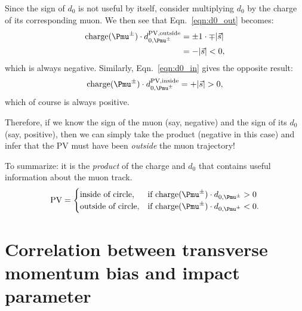 Since the sign of $d_0$ is not useful by itself, consider multiplying $d_0$ by the charge of its corresponding muon. 
We then see that Eqn.~\ref{eqn:d0_out} becomes:
\begin{align*}
    {\rm charge}(\Pmu^{\pm}) \cdot d_{0,\Pmu^{\pm}}^{\text{PV,outside}} &= \pm1 \cdot \mp \lvert \vec{s} \rvert \\
    &= - \lvert \vec{s} \rvert < 0,
\end{align*}
which is always negative. Similarly, Eqn.~\ref{eqn:d0_in} gives the opposite result:
\begin{equation*}
    {\rm charge}(\Pmu^{\pm}) \cdot d_{0,\Pmu^{\pm}}^{\text{PV,inside}} = + \lvert \vec{s} \rvert > 0,
\end{equation*}
which of course is always positive. 

Therefore, if we know the sign of the muon (say, negative) 
and the sign of its $d_0$ (say, positive), 
then we can simply take the product (negative in this case) 
and infer that the PV must have been \emph{outside} the muon trajectory!

To summarize: it is the \emph{product} of the charge and $d_0$ that contains useful information about the muon track. 
\[
    {\rm PV} = 
\begin{cases}
    \text{inside of circle},& \text{if charge}(\Pmu^{\pm}) \cdot d_{0,\Pmu^{\pm}} > 0 \\
    \text{outside of circle},& \text{if charge}(\Pmu^{\pm}) \cdot d_{0,\Pmu^{\pm}} < 0.
\end{cases}
\]




\chapter{Correlation between transverse momentum bias and impact parameter}

